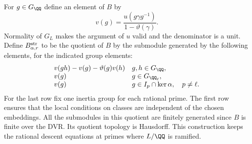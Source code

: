 \documentclass[a4paper,11pt]{article}
\theoremstyle{definition}
\theoremstyle{remark}
\numberwithin{equation}{section}
\begin{document}
For \(g\in G_{\QQ}\) define an element of \(B\) by
\[
        v(g)=\frac{u(g\gamma g^{-1})}{1-\vartheta(\gamma)} .
\]
Normality of \(G_L\) makes the argument of \(u\) valid and
the denominator is a unit. Define \(B_{\alpha,r}^{\rm str}\)
to be the quotient of \(B\) by the submodule generated by
the following elements, for the indicated group elements:
\[
\begin{array}{ll}
 v(gh)-v(g)-\vartheta(g)v(h)             & g,h\in G_{\QQ},\\
 v(g)                                    & g\in G_{\QQ_\ell},\\
 v(g)                                    & g\in I_p\cap\ker\alpha,\quad p\ne\ell .
\end{array}
\]
For the last row fix one inertia group for each rational
prime. The first row ensures that the local conditions on
classes are independent of the chosen embeddings.
All the submodules in this quotient are finitely generated
since \(B\) is finite over the DVR. Its quotient topology
is Hausdorff. This construction keeps the rational
descent equations at primes where \(L/\QQ\) is ramified.
\end{document}
